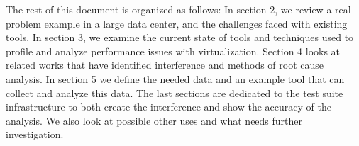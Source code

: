 \indent The rest of this document is organized as follows:  In section 2, we review a real problem example in a large data center, and the challenges faced with existing tools.  In section 3, we examine the current state of tools and techniques used to profile and analyze performance issues with virtualization.  Section 4 looks at related works that have identified interference and methods of root cause analysis.  In section 5 we define the needed data and an example tool that can collect and analyze this data.  The last sections are dedicated to the test suite infrastructure to both create the interference and show the accuracy of the analysis.  We also look at possible other uses and what needs further investigation.
